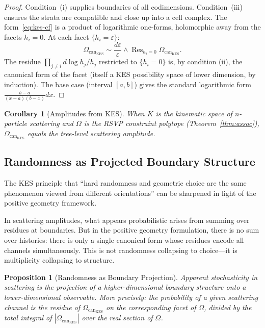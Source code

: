 \documentclass[12pt, oneside]{amsart}
\theoremstyle{plain}
\newtheorem{proposition}[theorem]{Proposition}
\newtheorem{corollary}[theorem]{Corollary}
\theoremstyle{definition}
\theoremstyle{remark}
\DeclareMathOperator{\Res}{Res}
\newcommand{\eps}{\varepsilon}
\newcommand{\OmKS}{\Omega}
\newcommand{\CF}{\Omega_{\mathrm{can}}}
\begin{document}
\begin{proof}
Condition~(i) supplies boundaries of all codimensions. Condition~(iii) ensures the strata are compatible and close up into a cell complex. The form~\eqref{eq:kes-cf} is a product of logarithmic one-forms, holomorphic away from the facets $h_i = 0$. At each facet $\{h_i = \eps\}$:
\[
  \CF_{\mathrm{KES}} \sim \frac{d\eps}{\eps} \wedge \Res_{h_i = 0}\CF_{\mathrm{KES}}.
\]
The residue $\prod_{j \neq i} d\log h_j / h_j$ restricted to $\{h_i = 0\}$ is, by condition (ii), the canonical form of the facet (itself a KES possibility space of lower dimension, by induction). The base case (interval $[a,b]$) gives the standard logarithmic form $\frac{b-a}{(x-a)(b-x)}dx$.
\end{proof}

\begin{corollary}[Amplitudes from KES]
When $K$ is the kinematic space of $n$-particle scattering and $\OmKS$ is the RSVP constraint polytope (Theorem~\ref{thm:assoc}), $\CF_{\mathrm{KES}}$ equals the tree-level scattering amplitude.
\end{corollary}

\subsection{Randomness as Projected Boundary Structure}

The KES principle that ``hard randomness and geometric choice are the same phenomenon viewed from different orientations'' can be sharpened in light of the positive geometry framework.

In scattering amplitudes, what appears probabilistic arises from summing over residues at boundaries. But in the positive geometry formulation, there is no sum over histories: there is only a single canonical form whose residues encode all channels simultaneously. This is not randomness collapsing to choice---it is multiplicity collapsing to structure.

\begin{proposition}[Randomness as Boundary Projection]
Apparent stochasticity in scattering is the projection of a higher-dimensional boundary structure onto a lower-dimensional observable. More precisely: the probability of a given scattering channel is the residue of $\CF_{\mathrm{KES}}$ on the corresponding facet of $\OmKS$, divided by the total integral of $|\CF_{\mathrm{KES}}|$ over the real section of $\OmKS$.
\end{proposition}
\end{document}
